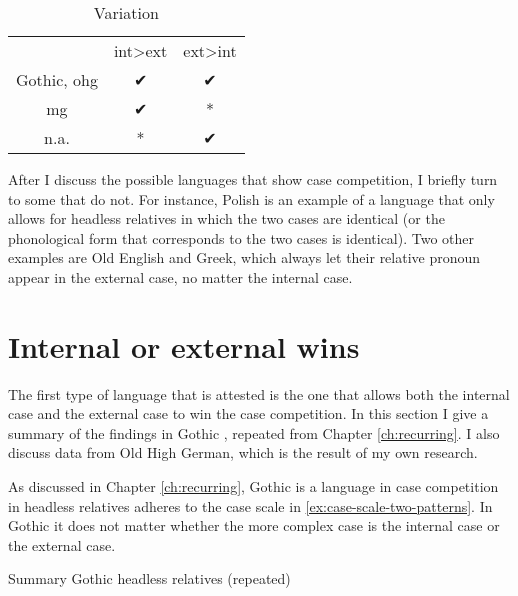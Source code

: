 \begin{table}[H]
 \center
 \caption {Variation}
  \begin{tabular}{ccc}
  \toprule
                    & \ac{int}>\ac{ext}  & \ac{ext}>\ac{int} \\
                    \cmidrule{2-3}
  Gothic, \ac{ohg}  & ✔                  & ✔                 \\
  \ac{mg}           & ✔                  & *                 \\
  n.a.              & *                  & ✔                 \\
  \bottomrule
\end{tabular}\label{tbl:competition-summary}
\end{table}

After I discuss the possible languages that show case competition, I briefly turn to some that do not.
For instance, Polish is an example of a language that only allows for headless relatives in which the two cases are identical (or the phonological form that corresponds to the two cases is identical).
Two other examples are Old English and Greek, which always let their relative pronoun appear in the external case, no matter the internal case.


\section{Internal or external wins}

The first type of language that is attested is the one that allows both the internal case and the external case to win the case competition. In this section I give a summary of the findings in Gothic \citep{harbert1978}, repeated from Chapter \ref{ch:recurring}. I also discuss data from Old High German, which is the result of my own research.

As discussed in Chapter \ref{ch:recurring}, Gothic is a language in case competition in headless relatives adheres to the case scale in \ref{ex:case-scale-two-patterns}. In Gothic it does not matter whether the more complex case is the internal case or the external case.

\begin{table}[H]
  \center
  \caption{Summary Gothic headless relatives (repeated)}
    
    \label{tbl:summary-gothic-repeated}
\end{table}

%
%

